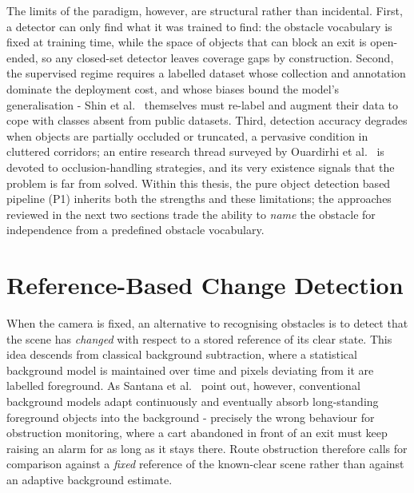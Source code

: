 The limits of the paradigm, however, are structural rather than incidental.
First, a detector can only find what it was trained to find: the obstacle
vocabulary is fixed at training time, while the space of objects that can block
an exit is open-ended, so any closed-set detector leaves coverage gaps by
construction. Second, the supervised regime requires a labelled dataset whose
collection and annotation dominate the deployment cost, and whose biases bound
the model's generalisation - Shin et al.~\cite{Shin2025} themselves must
re-label and augment their data to cope with classes absent from public
datasets. Third, detection accuracy degrades when objects are partially
occluded or truncated, a pervasive condition in cluttered corridors; an entire
research thread surveyed by Ouardirhi et al.~\cite{Ouardirhi2024} is devoted
to occlusion-handling strategies, and its very existence signals that the
problem is far from solved. Within this thesis, the pure object detection based pipeline (P1)
inherits both the strengths and these limitations; the approaches reviewed in
the next two sections trade the ability to \emph{name} the obstacle for
independence from a predefined obstacle vocabulary.

\section{Reference-Based Change Detection}
\label{sec:sota-change}

When the camera is fixed, an alternative to recognising obstacles is to detect
that the scene has \emph{changed} with respect to a stored reference of its
clear state. This idea descends from classical background subtraction, where a
statistical background model is maintained over time and pixels deviating from
it are labelled foreground. As Santana et al.~\cite{Santana2020} point out,
however, conventional background models adapt continuously and eventually
absorb long-standing foreground objects into the background - precisely the
wrong behaviour for obstruction monitoring, where a cart abandoned in front of
an exit must keep raising an alarm for as long as it stays there. Route
obstruction therefore calls for comparison against a \emph{fixed} reference of
the known-clear scene rather than against an adaptive background estimate.

